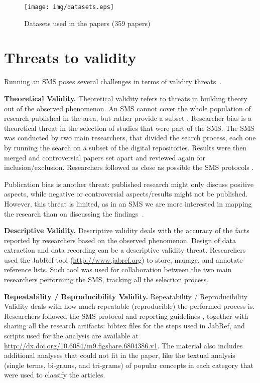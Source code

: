 \documentclass[journal]{IEEEtran}
\begin{document}
\begin{figure}[H]
\centering
\texttt{[image: img/datasets.eps]}
\caption{Datasets used in the papers (359 papers)}
\label{figure:availability-datasets}
\end{figure}


\section{Threats to validity}
 Running an SMS poses several challenges in terms of validity threats~\cite{ref:petersen2015guidelines,ref:budgen2006performing}. 

\textbf{Theoretical Validity.} Theoretical validity refers to threats in building theory out of the observed phenomenon. An SMS cannot cover the whole population of research published in the area, but rather provide a subset \cite{ref:budgen2006performing}. Researcher bias is a theoretical threat in the selection of studies that were part of the SMS. The SMS was conducted by two main researchers, that divided the search process, each one by running the search on a subset of the digital repositories. Results were then merged and controversial papers set apart and reviewed again for inclusion/exclusion. Researchers followed as close as possible the SMS protocols \cite{ref:budgen2006performing}.

Publication bias is another threat: published research might only discuss positive aspects, while negative or controversial aspects/results might not be published. However, this threat is limited, as in an SMS we are more interested in mapping the research than on discussing the findings~\cite{ref:petersen2015guidelines,ref:budgen2006performing}.

\textbf{Descriptive Validity.} Descriptive validity deals with the accuracy of the facts reported by researchers based on the observed phenomenon.
Design of data extraction and data recording can be a descriptive validity threat. Researchers used the JabRef tool (\url{http://www.jabref.org}) to store, manage, and annotate reference lists. Such tool was used for collaboration between the two main researchers performing the SMS, tracking all the selection process.

\textbf{Repeatability / Reproducibility Validity.} Repeatability / Reproducibility Validity deals with how much repeatable (reproducible) the performed process is. Researchers followed the SMS protocol and reporting guidelines \cite{ref:budgen2006performing}, together with sharing all the research artifacts: bibtex files for the steps used in JabRef, and scripts used for the analysis are available at \url{http://dx.doi.org/10.6084/m9.figshare.6804386.v1}. The material also includes additional analyses that could not fit in the paper, like the textual analysis (single terms, bi-grams, and tri-grams) of popular concepts in each category that were used to classify the articles.
\end{document}
